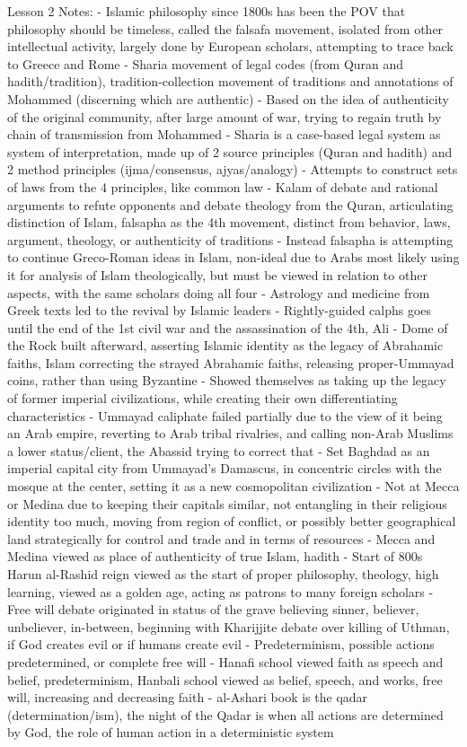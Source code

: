 \documentclass[11 pt, twoside]{article}
\begin{document}
Lesson 2 Notes:
- Islamic philosophy since 1800s has been the POV that philosophy should be timeless, called the falsafa movement, isolated from other intellectual activity, largely done by European scholars, attempting to trace back to Greece and Rome
- Sharia movement of legal codes (from Quran and hadith/tradition), tradition-collection movement of traditions and annotations of Mohammed (discerning which are authentic)
	- Based on the idea of authenticity of the original community, after large amount of war, trying to regain truth by chain of transmission from Mohammed
	- Sharia is a case-based legal system as system of interpretation, made up of 2 source principles (Quran and hadith) and 2 method principles (ijma/consensus, ajyas/analogy)
		- Attempts to construct sets of laws from the 4 principles, like common law
- Kalam of debate and rational arguments to refute opponents and debate theology from the Quran, articulating distinction of Islam, falsapha as the 4th movement, distinct from behavior, laws, argument, theology, or authenticity of traditions
	- Instead falsapha is attempting to continue Greco-Roman ideas in Islam, non-ideal due to Arabs most likely using it for analysis of Islam theologically, but must be viewed in relation to other aspects, with the same scholars doing all four
	- Astrology and medicine from Greek texts led to the revival by Islamic leaders
- Rightly-guided calphs goes until the end of the 1st civil war and the assassination of the 4th, Ali
- Dome of the Rock built afterward, asserting Islamic identity as the legacy of Abrahamic faiths, Islam correcting the strayed Abrahamic faiths, releasing proper-Ummayad coins, rather than using Byzantine
	- Showed themselves as taking up the legacy of former imperial civilizations, while creating their own differentiating characteristics
- Ummayad caliphate failed partially due to the view of it being an Arab empire, reverting to Arab tribal rivalries, and calling non-Arab Muslims a lower status/client, the Abassid trying to correct that
	- Set Baghdad as an imperial capital city from Ummayad's Damascus, in concentric circles with the mosque at the center, setting it as a new cosmopolitan civilization
		- Not at Mecca or Medina due to keeping their capitals similar, not entangling in their religious identity too much, moving from region of conflict, or possibly better geographical land strategically for control and trade and in terms of resources
		- Mecca and Medina viewed as place of authenticity of true Islam, hadith
	- Start of 800s Harun al-Rashid reign viewed as the start of proper philosophy, theology, high learning, viewed as a golden age, acting as patrons to many foreign scholars
- Free will debate originated in status of the grave believing sinner, believer, unbeliever, in-between, beginning with Kharijjite debate over killing of Uthman, if God creates evil or if humans create evil
	- Predeterminism, possible actions predetermined, or complete free will
	- Hanafi school viewed faith as speech and belief, predeterminism, Hanbali school viewed as belief, speech, and works, free will, increasing and decreasing faith
- al-Ashari book is the qadar (determination/ism), the night of the Qadar is when all actions are determined by God, the role of human action in a deterministic system
\end{document}
